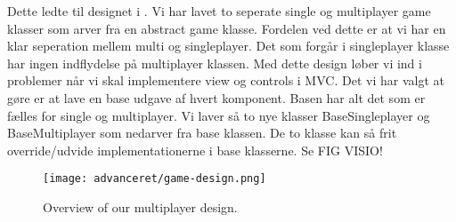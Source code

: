 Dette ledte til designet i  . Vi har lavet to seperate single og multiplayer game klasser som arver fra en abstract game klasse. Fordelen ved dette er at vi har en klar seperation mellem multi og singleplayer. Det som forgår i singleplayer klasse har ingen indflydelse på multiplayer klassen. Med dette design løber vi ind i problemer når vi skal implementere view og controls i MVC. Det vi har valgt at gøre er at lave en base udgave af hvert komponent. Basen har alt det som er fælles for single og multiplayer. Vi laver så to nye klasser BaseSingleplayer og BaseMultiplayer som nedarver fra base klassen.  De to klasse kan så frit override/udvide implementationerne i base klasserne.  Se FIG VISIO!


\begin{figure}
	\centering
	\graphicspath{ {pics/} }
   \texttt{[image: advanceret/game-design.png]}
	\hspace{0.1\textwidth}
	\caption{Overview of our multiplayer design.}
\end{figure}

